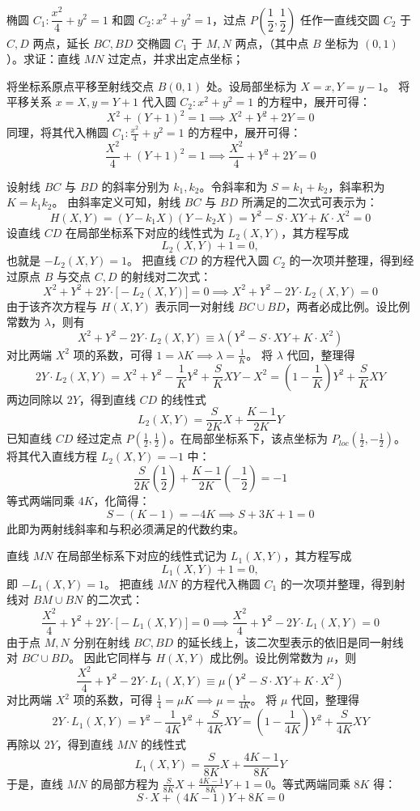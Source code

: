\begin{exercise}
椭圆 \( C_1: \dfrac{x^2}{4} + y^2 = 1 \) 和圆 \( C_2: x^2 + y^2 = 1 \)，过点 \( P\left(\dfrac{1}{2},\dfrac{1}{2}\right) \) 任作一直线交圆 \( C_2 \) 于 \( C,D \) 两点，延长 \( BC,BD \) 交椭圆 \( C_1 \) 于 \( M,N \) 两点，（其中点 \( B \) 坐标为 \( (0,1) \)）。求证：直线 \( MN \) 过定点，并求出定点坐标；
\end{exercise}
\begin{solution}
将坐标系原点平移至射线交点 $B(0,1)$ 处。设局部坐标为 $X = x, Y = y - 1$。
将平移关系 $x = X, y = Y + 1$ 代入圆 $C_2: x^2 + y^2 = 1$ 的方程中，展开可得：
$$ X^2 + (Y+1)^2 = 1 \implies X^2 + Y^2 + 2Y = 0 $$
同理，将其代入椭圆 $C_1: \frac{x^2}{4} + y^2 = 1$ 的方程中，展开可得：
$$ \frac{X^2}{4} + (Y+1)^2 = 1 \implies \frac{X^2}{4} + Y^2 + 2Y = 0 $$

设射线 $BC$ 与 $BD$ 的斜率分别为 $k_1, k_2$。令斜率和为 $S = k_1 + k_2$，斜率积为 $K = k_1 k_2$。
由斜率定义可知，射线 $BC$ 与 $BD$ 所满足的二次式可表示为：
$$ H(X,Y) = (Y - k_1 X)(Y - k_2 X) = Y^2 - S \cdot XY + K \cdot X^2 = 0 $$
设直线 $CD$ 在局部坐标系下对应的线性式为 $L_2(X,Y)$，其方程写成
$$L_2(X,Y) + 1 = 0,$$
也就是 $-L_2(X,Y)=1$。
把直线 $CD$ 的方程代入圆 $C_2$ 的一次项并整理，得到经过原点 $B$ 与交点 $C, D$ 的射线对二次式：
$$ X^2 + Y^2 + 2Y \cdot \big[-L_2(X,Y)\big] = 0 \implies X^2 + Y^2 - 2Y \cdot L_2(X,Y) = 0 $$
由于该齐次方程与 $H(X,Y)$ 表示同一对射线 $BC \cup BD$，两者必成比例。设比例常数为 $\lambda$，则有
$$ X^2 + Y^2 - 2Y \cdot L_2(X,Y) \equiv \lambda (Y^2 - S \cdot XY + K \cdot X^2) $$
对比两端 $X^2$ 项的系数，可得 $1 = \lambda K \implies \lambda = \frac{1}{K}$。
将 $\lambda$ 代回，整理得
$$ 2Y \cdot L_2(X,Y) = X^2 + Y^2 - \frac{1}{K} Y^2 + \frac{S}{K} XY - X^2 = \left(1 - \frac{1}{K}\right) Y^2 + \frac{S}{K} XY $$
两边同除以 $2Y$，得到直线 $CD$ 的线性式
$$ L_2(X,Y) = \frac{S}{2K} X + \frac{K-1}{2K} Y $$
已知直线 $CD$ 经过定点 $P\left(\frac{1}{2}, \frac{1}{2}\right)$。在局部坐标系下，该点坐标为 $P_{loc}\left(\frac{1}{2}, -\frac{1}{2}\right)$。
将其代入直线方程 $L_2(X,Y) = -1$ 中：
$$ \frac{S}{2K} \left(\frac{1}{2}\right) + \frac{K-1}{2K} \left(-\frac{1}{2}\right) = -1 $$
等式两端同乘 $4K$，化简得：
$$ S - (K-1) = -4K \implies S + 3K + 1 = 0 $$
此即为两射线斜率和与积必须满足的代数约束。

直线 $MN$ 在局部坐标系下对应的线性式记为 $L_1(X,Y)$，其方程写成
$$L_1(X,Y) + 1 = 0,$$
即 $-L_1(X,Y)=1$。
把直线 $MN$ 的方程代入椭圆 $C_1$ 的一次项并整理，得到射线对 $BM \cup BN$ 的二次式：
$$ \frac{X^2}{4} + Y^2 + 2Y \cdot \big[-L_1(X,Y)\big] = 0 \implies \frac{X^2}{4} + Y^2 - 2Y \cdot L_1(X,Y) = 0 $$
由于点 $M, N$ 分别在射线 $BC, BD$ 的延长线上，该二次型表示的依旧是同一射线对 $BC \cup BD$。
因此它同样与 $H(X,Y)$ 成比例。设比例常数为 $\mu$，则
$$ \frac{X^2}{4} + Y^2 - 2Y \cdot L_1(X,Y) \equiv \mu (Y^2 - S \cdot XY + K \cdot X^2) $$
对比两端 $X^2$ 项的系数，可得 $\frac{1}{4} = \mu K \implies \mu = \frac{1}{4K}$。
将 $\mu$ 代回，整理得
$$ 2Y \cdot L_1(X,Y) = Y^2 - \frac{1}{4K} Y^2 + \frac{S}{4K} XY = \left(1 - \frac{1}{4K}\right) Y^2 + \frac{S}{4K} XY $$
再除以 $2Y$，得到直线 $MN$ 的线性式
$$ L_1(X,Y) = \frac{S}{8K} X + \frac{4K-1}{8K} Y $$
于是，直线 $MN$ 的局部方程为 $\frac{S}{8K} X + \frac{4K-1}{8K} Y + 1 = 0$。等式两端同乘 $8K$ 得：
$$ S \cdot X + (4K-1) Y + 8K = 0 $$


\end{solution}
